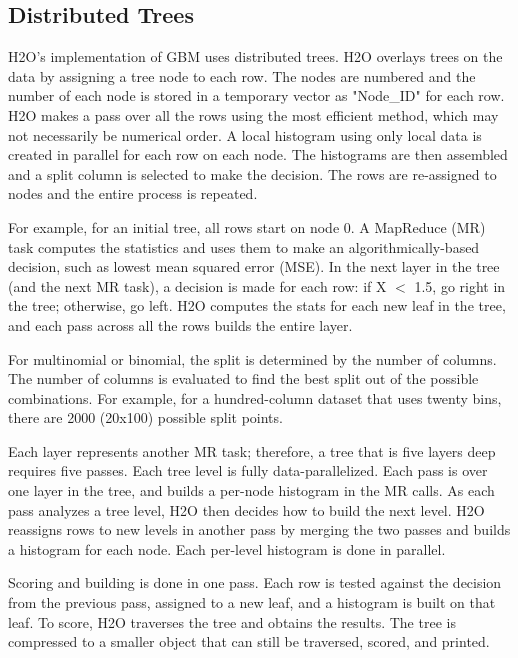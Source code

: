 \subsection{Distributed Trees}

H2O's implementation of GBM uses distributed trees. H2O overlays trees on the data by assigning a tree node to each row.
The nodes are numbered and the number of each node is stored in a temporary vector as "Node\_ID" for each row. H2O makes
a pass over all the rows using the most efficient method, which may not necessarily be  numerical order. A local
histogram using only local data is created in parallel for each row on each node. The histograms are then assembled and a split column is selected to make the decision. The rows are re-assigned to nodes and the entire process is repeated.

For example, for an initial tree, all rows start on node 0. A MapReduce (MR) task computes the statistics and uses
them to make an algorithmically-based decision, such as lowest mean squared error (MSE). In the next layer in the
tree (and the next MR task), a decision is made for each row: if X $<$ 1.5, go right in the tree; otherwise, go left.
H2O computes the stats for each new leaf in the tree, and each pass across all the rows builds the entire layer.

For multinomial or binomial, the split is determined by the number of columns. The number of columns is evaluated to
find the best split out of the possible combinations. For example, for a hundred-column dataset that uses twenty bins,
there are 2000 (20x100) possible split points.

Each layer represents another MR task; therefore, a tree that is five layers deep requires five passes. Each tree
level is fully data-parallelized. Each pass is over one layer in the tree, and builds a per-node histogram in the
MR calls. As each pass analyzes a tree level, H2O then decides how to build the next level. H2O reassigns rows to
new levels in another pass by merging the two passes and builds a histogram for each node. Each per-level histogram
is done in parallel.

Scoring and building is done in one pass. Each row is tested against the decision from the previous pass, assigned
to a new leaf, and a histogram is built on that leaf. To score, H2O traverses the tree and obtains the results. The
tree is compressed to a smaller object that can still be traversed, scored, and printed.

